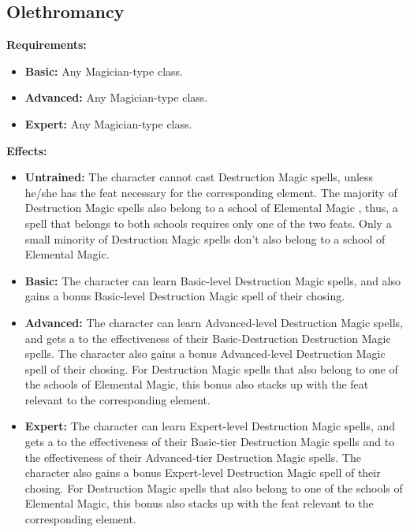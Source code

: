 \documentclass[openany,10pt,a4paper]{book}
\begin{document}
\subsection{Olethromancy}
\begin{table}[!ht]
\centering
{}
\end{table}
\textbf{Requirements:}
\begin{itemize}
	\item \textbf{Basic:} Any Magician-type class.
	\item \textbf{Advanced:} Any Magician-type class.
	\item \textbf{Expert:} Any Magician-type class.
\end{itemize}
\textbf{Effects:}
\begin{itemize}
	\item \textbf{Untrained:} The character cannot cast Destruction Magic spells, unless he/she has the feat necessary for the corresponding element. The majority of Destruction Magic spells also belong to a school of Elemental Magic , thus, a spell that belongs to both schools requires only one of the two feats. Only a small minority of Destruction Magic spells don't also belong to a school of Elemental Magic.
	\item \textbf{Basic:} The character can learn Basic-level Destruction Magic spells, and also gains a bonus Basic-level Destruction Magic spell of their chosing.
	\item \textbf{Advanced:} The character can learn Advanced-level Destruction Magic spells, and gets a  to the effectiveness of their Basic-Destruction Destruction Magic spells. The character also gains a bonus Advanced-level Destruction Magic spell of their chosing. For Destruction Magic spells that also belong to one of the schools of Elemental Magic, this bonus also stacks up with the feat relevant to the corresponding element.
	\item \textbf{Expert:} The character can learn Expert-level Destruction Magic spells, and gets a  to the effectiveness of their Basic-tier Destruction Magic spells and  to the effectiveness of their Advanced-tier Destruction Magic spells. The character also gains a bonus Expert-level Destruction Magic spell of their chosing. For Destruction Magic spells that also belong to one of the schools of Elemental Magic, this bonus also stacks up with the feat relevant to the corresponding element.
\end{itemize}\newpage
\end{document}
